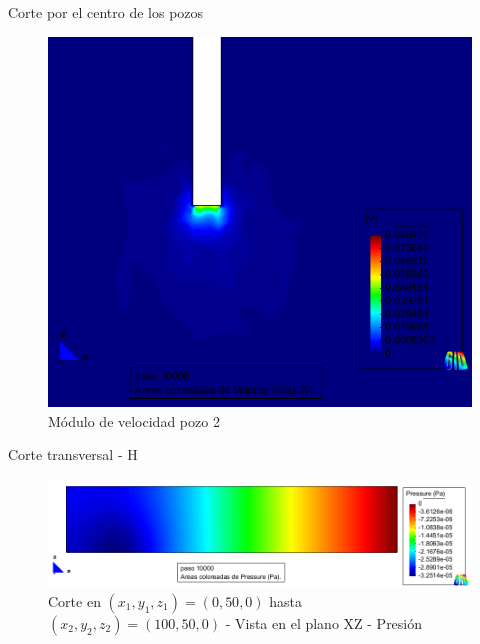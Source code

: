 \documentclass[spanish]{beamer}
\begin{document}
%
\begin{frame}{Corte por el centro de los pozos}
\begin{center}
\begin{figure}[htbp]
\centerline{\includegraphics[scale=0.25]{../img/100m/resul/100_XZ_velocidad_corte_centro_pozo2}}
\caption{Módulo de velocidad pozo 2}
\end{figure}
\end{center}
\end{frame}
%
\begin{frame}{Corte transversal - H}
\begin{center}
\begin{figure}[htbp]
\centerline{\includegraphics[scale=0.3]{../img/100m/resul/100_XZ_presion_corte_horizontal}}
\caption{Corte en $(x_1,y_1,z_1)=(0,50,0)$ hasta $(x_2,y_2,z_2)=(100,50,0)$ - Vista en el plano XZ - Presión}
\end{figure}
\end{center}
\end{frame}
%
\end{document}
